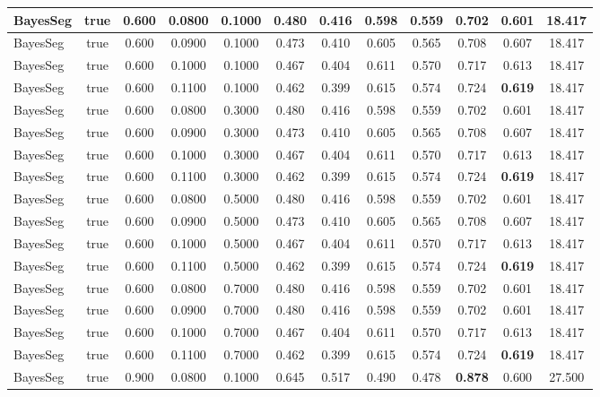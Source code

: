 \documentclass{article}
\begin{document}
\begin{longtable}[c]{|l|c|c|c|c|c|c|c|c|c|c|c|}
 BayesSeg & true & 0.600 & 0.0800 & 0.1000 & 0.480 & 0.416 & 0.598 & 0.559 & 0.702 & 0.601 & 18.417  \\ \hline 
 BayesSeg & true & 0.600 & 0.0900 & 0.1000 & 0.473 & 0.410 & 0.605 & 0.565 & 0.708 & 0.607 & 18.417  \\ \hline 
 BayesSeg & true & 0.600 & 0.1000 & 0.1000 & 0.467 & 0.404 & 0.611 & 0.570 & 0.717 & 0.613 & 18.417  \\ \hline 
 BayesSeg & true & 0.600 & 0.1100 & 0.1000 & 0.462 & 0.399 & 0.615 & 0.574 & 0.724 & \cellcolor{gray!20} \textbf{0.619} & 18.417  \\ \hline 
 BayesSeg & true & 0.600 & 0.0800 & 0.3000 & 0.480 & 0.416 & 0.598 & 0.559 & 0.702 & 0.601 & 18.417  \\ \hline 
 BayesSeg & true & 0.600 & 0.0900 & 0.3000 & 0.473 & 0.410 & 0.605 & 0.565 & 0.708 & 0.607 & 18.417  \\ \hline 
 BayesSeg & true & 0.600 & 0.1000 & 0.3000 & 0.467 & 0.404 & 0.611 & 0.570 & 0.717 & 0.613 & 18.417  \\ \hline 
 BayesSeg & true & 0.600 & 0.1100 & 0.3000 & 0.462 & 0.399 & 0.615 & 0.574 & 0.724 & \cellcolor{gray!20} \textbf{0.619} & 18.417  \\ \hline 
 BayesSeg & true & 0.600 & 0.0800 & 0.5000 & 0.480 & 0.416 & 0.598 & 0.559 & 0.702 & 0.601 & 18.417  \\ \hline 
 BayesSeg & true & 0.600 & 0.0900 & 0.5000 & 0.473 & 0.410 & 0.605 & 0.565 & 0.708 & 0.607 & 18.417  \\ \hline 
 BayesSeg & true & 0.600 & 0.1000 & 0.5000 & 0.467 & 0.404 & 0.611 & 0.570 & 0.717 & 0.613 & 18.417  \\ \hline 
 BayesSeg & true & 0.600 & 0.1100 & 0.5000 & 0.462 & 0.399 & 0.615 & 0.574 & 0.724 & \cellcolor{gray!20} \textbf{0.619} & 18.417  \\ \hline 
 BayesSeg & true & 0.600 & 0.0800 & 0.7000 & 0.480 & 0.416 & 0.598 & 0.559 & 0.702 & 0.601 & 18.417  \\ \hline 
 BayesSeg & true & 0.600 & 0.0900 & 0.7000 & 0.480 & 0.416 & 0.598 & 0.559 & 0.702 & 0.601 & 18.417  \\ \hline 
 BayesSeg & true & 0.600 & 0.1000 & 0.7000 & 0.467 & 0.404 & 0.611 & 0.570 & 0.717 & 0.613 & 18.417  \\ \hline 
 BayesSeg & true & 0.600 & 0.1100 & 0.7000 & 0.462 & 0.399 & 0.615 & 0.574 & 0.724 & \cellcolor{gray!20} \textbf{0.619} & 18.417  \\ \hline 
 BayesSeg & true & 0.900 & 0.0800 & 0.1000 & 0.645 & 0.517 & 0.490 & 0.478 & \cellcolor{gray!20} \textbf{0.878} & 0.600 & 27.500  \\ \hline 

\end{longtable}
\end{document}
